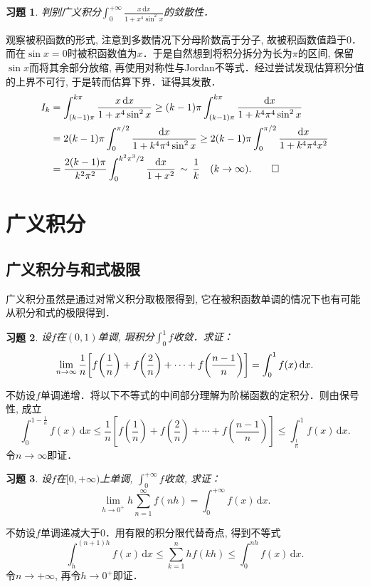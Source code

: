 \documentclass[11pt,a4paper]{ctexart}
\makeatletter
\theoremstyle{thmseries} %
\theoremstyle{exerseries}
\newtheorem{exer}{习题}[section]
\renewenvironment{proof}[1][\proofname]{\par
  \pushQED{\qed}%
  \normalfont \topsep6\p@\@plus6\p@\relax
  \trivlist
  \item[\hskip\labelsep
        \itshape
    #1\@addpunct{}]\ignorespaces
}{%
  \popQED\endtrivlist\@endpefalse
}
\newenvironment{sol}{\begin{proof}[\bfseries\upshape 解\quad]}{\end{proof}}
\newenvironment{pf}{\begin{proof}[\bfseries\upshape 证\quad]}{\end{proof}}
\newcommand{\bra}[1]{\mathopen{}\left(#1\right)}
\newcommand{\sbra}[1]{\mathopen{}\left[#1\right]}
\renewcommand{\d}{\mathrm{d}}
\def \nti {\mathnormal{n}\to\infty}
\makeatother
\begin{document}
\begin{exer}
	判别广义积分$\int_{0}^{+\infty}\frac{x\,\d x}{1+x^4\sin^2x}$的敛散性．
\end{exer}
\begin{sol}
	观察被积函数的形式, 注意到多数情况下分母阶数高于分子, 故被积函数值趋于$0$．而在$\sin x=0$时被积函数值为$x$．于是自然想到将积分拆分为长为$\pi$的区间, 保留$\sin x$而将其余部分放缩, 再使用对称性与Jordan不等式．经过尝试发现估算积分值的上界不可行, 于是转而估算下界．证得其发散．
	\begin{align*}
		I_k&=\int_{(k-1)\pi}^{k\pi}\frac{x\,\d x}{1+x^4\sin^2x}\geq(k-1)\pi\int_{(k-1)\pi}^{k\pi}\frac{\d x}{1+k^4\pi^4\sin^2x}\\
		&=2(k-1)\pi\int_{0}^{\pi/2}\frac{\d x}{1+k^4\pi^4\sin^2x}\geq2(k-1)\pi\int_{0}^{\pi/2}\frac{\d x}{1+k^4\pi^4x^2}\\
		&=\frac{2(k-1)\pi}{k^2\pi^2}\int_{0}^{k^2\pi^3/2}\frac{\d x}{1+x^2}\,\sim\,\frac{1}{k}\quad(k\to\infty).\qedhere
	\end{align*}
\end{sol}


\section{广义积分}
\subsection{广义积分与和式极限}
广义积分虽然是通过对常义积分取极限得到, 它在被积函数单调的情况下也有可能从积分和式的极限得到．
\begin{exer}
	设$f$在$(0,1)$单调, 瑕积分$\int_{0}^{1}f$收敛．求证：
	\[\lim_{\nti}\frac{1}{n}\sbra{f\bra{\frac{1}{n}}+f\bra{\frac{2}{n}}+\cdots+f\bra{\frac{n-1}{n}}}=\int_{0}^{1}f(x)\,\d x.\]
\end{exer}
\begin{pf}
	不妨设$f$单调递增．将以下不等式的中间部分理解为阶梯函数的定积分．则由保号性, 成立
	\[\int_{0}^{1-\frac{1}{n}}f(x)\,\d x\leq\frac{1}{n}\sbra{f\bra{\frac{1}{n}}+f\bra{\frac{2}{n}}+\cdots+f\bra{\frac{n-1}{n}}}\leq\int_{\frac{1}{n}}^{1}f(x)\,\d x.\]
	令$n\to\infty$即证．
\end{pf}

\begin{exer}
	设$f$在$[0,+\infty)$上单调, $\int_{0}^{+\infty}f$收敛, 求证：
	\[\lim_{h\to0^+}h\sum_{n=1}^{\infty}f(nh)=\int_{0}^{+\infty}f(x)\,\d x.\]
\end{exer}
\begin{pf}
	不妨设$f$单调递减大于$0$．用有限的积分限代替奇点, 得到不等式
	\[\int_{h}^{(n+1)h}f(x)\,\d x\leq\sum_{k=1}^{n}hf(kh)\leq\int_{0}^{nh}f(x)\,\d x.\]
	令$n\to+\infty$, 再令$h\to0^+$即证．
\end{pf}
\end{document}
